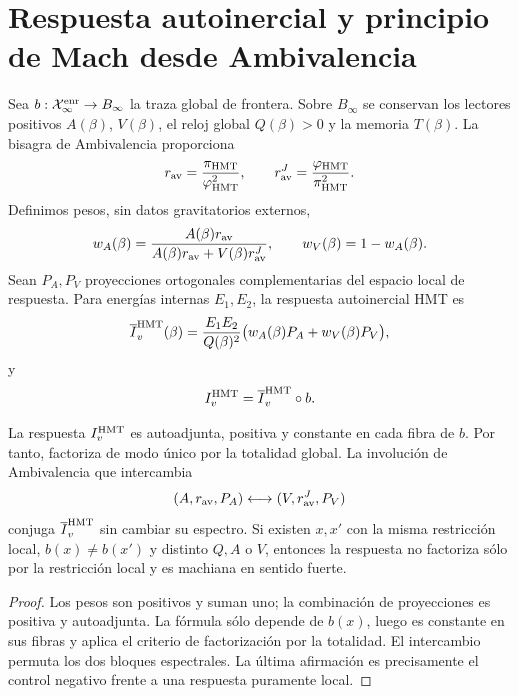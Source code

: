 \section{Respuesta autoinercial y principio de Mach desde Ambivalencia}
\label{sec:hmtf2-mach-ambivalencia}

Sea \(b:\mathcal X_\infty^{\rm enr}\to B_\infty\) la traza global de
frontera. Sobre \(B_\infty\) se conservan los lectores positivos
\(A(\beta)\), \(V(\beta)\), el reloj global \(Q(\beta)>0\) y la memoria
\(T(\beta)\). La bisagra de Ambivalencia proporciona
\[
 r_{\rm av}=\frac{\pi_{\rm HMT}}{\varphi_{\rm HMT}^2},
 \qquad
 r_{\rm av}^J=\frac{\varphi_{\rm HMT}}{\pi_{\rm HMT}^2}.
\]
Definimos pesos, sin datos gravitatorios externos,
\[
 w_A(\beta)
 =\frac{A(\beta)r_{\rm av}}
 {A(\beta)r_{\rm av}+V(\beta)r_{\rm av}^J},
 \qquad
 w_V(\beta)=1-w_A(\beta).
\]
Sean \(P_A,P_V\) proyecciones ortogonales complementarias del espacio local
de respuesta. Para energías internas \(E_1,E_2\), la respuesta
autoinercial HMT es
\[
 \overline I_v^{\rm HMT}(\beta)
 =\frac{E_1E_2}{Q(\beta)^2}
 \bigl(w_A(\beta)P_A+w_V(\beta)P_V\bigr),
\]
y
\[
 I_v^{\rm HMT}
 =\overline I_v^{\rm HMT}\circ b.
\]

\begin{theorem}
\label{thm:hmtf2-respuesta-mach}
La respuesta \(I_v^{\rm HMT}\) es autoadjunta, positiva y constante en cada
fibra de \(b\). Por tanto, factoriza de modo único por la totalidad global.
La involución de Ambivalencia que intercambia
\[
 (A,r_{\rm av},P_A)\longleftrightarrow
 (V,r_{\rm av}^J,P_V)
\]
conjuga \(\overline I_v^{\rm HMT}\) sin cambiar su espectro. Si existen
\(x,x'\) con la misma restricción local, \(b(x)\ne b(x')\) y distinto
\(Q,A\) o \(V\), entonces la respuesta no factoriza sólo por la restricción
local y es machiana en sentido fuerte.
\end{theorem}

\begin{proof}
Los pesos son positivos y suman uno; la combinación de proyecciones es
positiva y autoadjunta. La fórmula sólo depende de \(b(x)\), luego es
constante en sus fibras y aplica el criterio de factorización por la
totalidad. El intercambio permuta los dos bloques espectrales. La última
afirmación es precisamente el control negativo frente a una respuesta
puramente local.
\end{proof}

